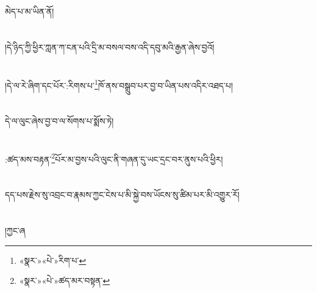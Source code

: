 མེད་པ་མ་ཡིན་ནོ།\chapter{ }།དེ་ཉིད་ཀྱི་ཕྱིར་ཀླན་ཀ་ངན་པའི་དྲི་མ་བསལ་བས་འདི་དབུ་མའི་རྒྱན་ཞེས་བྱའོ།\chapter{ }།དེ་ལ་རེ་ཞིག་དང་པོར་:རིགས་པ་\footnote{«སྣར་»«པེ་»རིག་པ་}ཁོ་ནས་བསྒྲུབ་པར་བྱ་བ་ཡིན་པས་འདིར་འཐད་པ།\chapter{ }དེ་ལ་ལུང་ཞེས་བྱ་བ་ལ་སོགས་པ་སྨོས་ཏེ།\chapter{ }:ཚད་མས་བརྟན་\footnote{«སྣར་»«པེ་»ཚད་མར་བསྟན་}པོར་མ་བྱས་པའི་ལུང་ནི་གཞན་དུ་ཡང་དྲང་བར་ནུས་པའི་ཕྱིར།\chapter{ }དད་པས་རྗེས་སུ་འབྲང་བ་རྣམས་ཀྱང་ངེས་པ་མི་སྐྱེ་བས་ཡོངས་སུ་ཚིམ་པར་མི་འགྱུར་རོ།\chapter{ }།ཀྱང་ཞ
